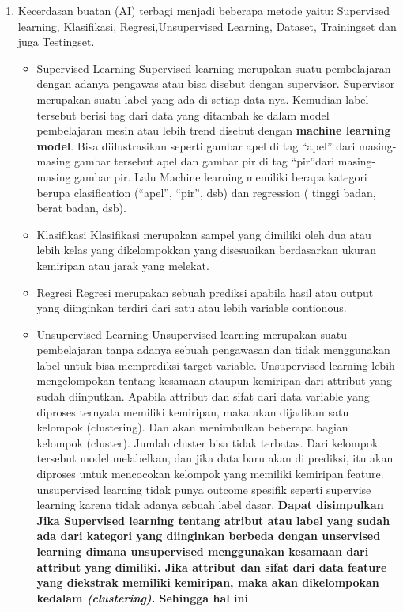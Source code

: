 \begin{enumerate}
	\item Kecerdasan buatan (AI) terbagi menjadi beberapa metode yaitu:
	\hfill\break
	Supervised learning,  Klasifikasi, Regresi,Unsupervised Learning, Dataset, Trainingset dan juga Testingset.
	\begin{itemize}
		\item Supervised Learning
		\hfill\break
	Supervised learning merupakan suatu pembelajaran dengan adanya pengawas atau bisa disebut dengan supervisor. Supervisor merupakan suatu label yang ada di setiap data nya. Kemudian label tersebut berisi tag dari data yang ditambah ke dalam model pembelajaran mesin atau lebih trend disebut dengan \textbf{machine learning model}. Bisa diilustrasikan seperti gambar apel di tag “apel” dari masing-masing gambar tersebut apel dan gambar pir di tag “pir”dari masing-masing gambar pir. Lalu Machine learning memiliki berapa kategori berupa clasification (“apel”, “pir”, dsb) dan regression ( tinggi badan, berat badan, dsb).
		\item Klasifikasi
		\hfill\break
		Klasifikasi merupakan sampel yang dimiliki oleh dua atau lebih kelas yang dikelompokkan yang disesuaikan berdasarkan ukuran kemiripan atau jarak yang melekat. 
		\item Regresi
		\hfill\break
    Regresi	merupakan sebuah prediksi apabila hasil atau output yang diinginkan terdiri dari satu atau lebih variable contionous.
		\item Unsupervised Learning 
		\hfill\break
Unsupervised learning merupakan suatu pembelajaran tanpa adanya sebuah pengawasan dan tidak menggunakan label untuk bisa memprediksi target variable. Unsupervised learning lebih mengelompokan tentang kesamaan ataupun kemiripan dari attribut yang sudah diinputkan. Apabila attribut dan sifat dari data variable yang diproses ternyata memiliki kemiripan, maka akan dijadikan
satu kelompok (clustering). Dan akan menimbulkan beberapa bagian kelompok (cluster). Jumlah cluster bisa tidak terbatas. Dari kelompok tersebut model melabelkan, dan jika data baru akan di prediksi, itu akan diproses untuk mencocokan kelompok yang memiliki kemiripan feature. unsupervised learning tidak punya outcome spesifik seperti supervise learning karena tidak adanya sebuah label dasar.
\hfill\break
\textbf{Dapat disimpulkan Jika Supervised learning tentang atribut atau label yang sudah ada dari kategori yang diinginkan berbeda dengan unservised learning dimana unsupervised menggunakan kesamaan dari attribut yang dimiliki. Jika attribut dan sifat dari data feature yang diekstrak memiliki
kemiripan, maka akan dikelompokan kedalam \textit{(clustering)}. Sehingga hal ini
}
\end{itemize}
\end{enumerate}
